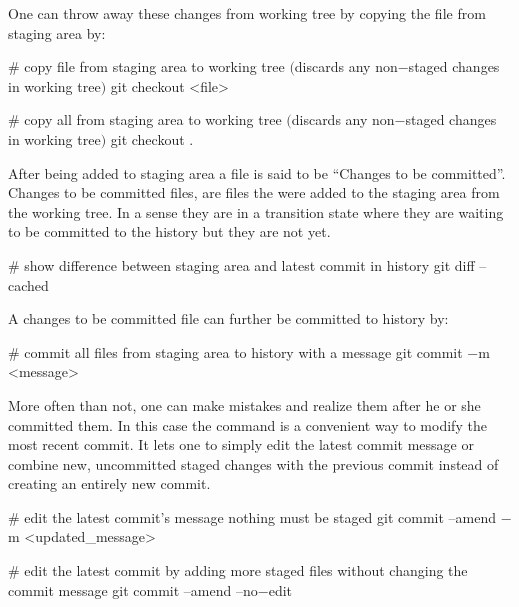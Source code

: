 One can throw away these changes from working tree by copying the file from staging area by:

\begin{bash}
# copy file from staging area to working tree $($discards any non$-$staged changes in working tree$)$
git checkout <file>
\end{bash}


\begin{bash}
# copy all from staging area to working tree $($discards any non$-$staged changes in working tree$)$
git checkout .
\end{bash}

After being added to staging area a file is said to be ``Changes to be committed''. Changes to be committed files,
are files the were added to the staging area from the working tree. In a sense they are in a transition state where
they are waiting to be committed to the history but they are not yet.

\begin{bash}
# show difference between staging area and latest commit in history
git diff --cached
\end{bash}

A changes to be committed file can further be committed to history by:

\begin{bash}
# commit all files from staging area to history with a message
git commit $-$m <message>
\end{bash}


More often than not, one can make mistakes and realize them after he or she committed them. In this case the
 command is a convenient way to modify the most recent commit. It lets one to simply edit
the latest commit message or combine new, uncommitted staged changes with the previous commit instead of creating an
entirely new commit.

\begin{bash}
# edit the latest commit’s message nothing must be staged
git commit --amend $-$m <updated_message>
\end{bash}

\begin{bash}
# edit the latest commit by adding more staged files without changing the commit message
git commit --amend --no$-$edit
\end{bash}

